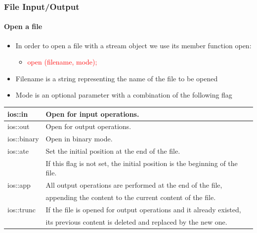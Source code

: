 \documentclass[hyperref={pdfpagelabels=true}]{beamer}
\begin{document}
\begin{frame}
\frametitle{File Input/Output}
\framesubtitle{Open a file}
\begin{itemize}[<+->]
\item In order to open a file with a stream object we use its member function open:
\begin{itemize}[<+->]
\item \alert{\textcolor{red}{open (filename, mode);}}
\end{itemize}
\item Filename is a string representing the name of the file to be opened
\item Mode is an optional parameter with a combination of the following flag
\end{itemize}
\scriptsize{
\begin{tabular}{| l | l |}
\hline 
ios::in	&Open for input operations. \\ \hline
ios::out	&Open for output operations.\\ \hline
ios::binary &Open in binary mode.\\ \hline
ios::ate	&Set the initial position at the end of the file.\\
                &If this flag is not set, the initial position is the beginning of the file.\\ \hline
ios::app	&All output operations are performed at the end of the file, \\
               &appending the content to the current content of the file.\\ \hline
ios::trunc	&If the file is opened for output operations and it already existed,\\
                  &its previous content is deleted and replaced by the new one. \\ \hline
\end{tabular}}

\end{frame}
\end{document}
